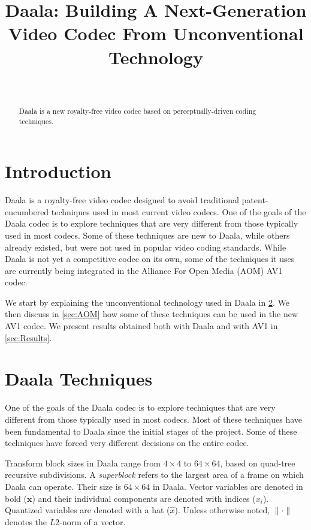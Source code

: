 \documentclass[english,conference,10pt]{IEEEtran}
\begin{document}
\title{Daala: Building A Next-Generation Video Codec From Unconventional
Technology}


\author{\author{
\\
}}
\maketitle
\begin{abstract}
Daala is a new royalty-free video codec based on perceptually-driven
coding techniques.
\end{abstract}


\section{Introduction}

Daala is a royalty-free video codec designed to avoid traditional
patent-encumbered techniques used in most current video codecs. One
of the goals of the Daala codec is to explore techniques that are
very different from those typically used in most codecs. Some of
these techniques are new to Daala, while others already existed, but
were not used in popular video coding standards. While Daala is not yet
a competitive codec on its own, some of the techniques it uses are
currently being integrated in the Alliance For Open Media (AOM) AV1 codec.

We start by explaining the unconventional technology used in Daala
in \cref{sec:techniques}. We then discuss in \cref{sec:AOM} how some of
these techniques can be used in the new AV1 codec. We present results
obtained both with Daala and with AV1 in \cref{sec:Results}.

\section{Daala Techniques}
\label{sec:techniques}

One of the goals of the Daala codec is to explore techniques that
are very different from those typically used in most codecs. Most
of these techniques have been fundamental to Daala since the initial
stages of the project. Some of these techniques have forced very different
decisions on the entire codec.

Transform block sizes in Daala range from $4 \times 4$
to $64 \times 64$, based on quad-tree recursive subdivisions. A
\textit{superblock} refers to the largest area of a frame on which Daala
can operate. Their size is $64\times 64$ in Daala. Vector variables are
denoted in bold ($\mathbf{x}$) and their individual components are denoted
with indices ($x_i$). Quantized variables are denoted with a hat ($\hat{x}$).
Unless otherwise noted, $\|\cdot\|$ denotes the $L2$-norm of a vector.
\end{document}
